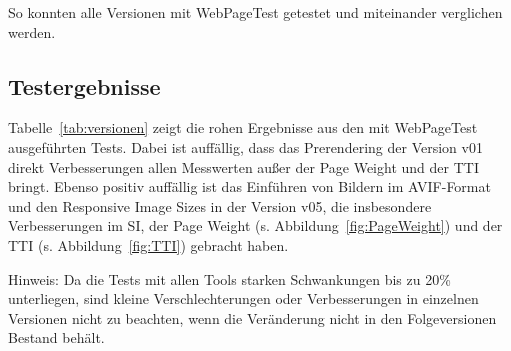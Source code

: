 \documentclass[11pt,a4paper]{article}
\begin{document}
So konnten alle Versionen mit WebPageTest getestet und miteinander verglichen werden.

\subsection{Testergebnisse}
Tabelle~\ref{tab:versionen} zeigt die rohen Ergebnisse aus den mit WebPageTest ausgeführten Tests.
Dabei ist auffällig, dass das Prerendering der Version v01 direkt Verbesserungen allen Messwerten außer der Page Weight und der TTI bringt.
Ebenso positiv auffällig ist das Einführen von Bildern im AVIF-Format und den Responsive Image Sizes in der Version v05, die insbesondere Verbesserungen im SI, der Page Weight (s. Abbildung~\ref{fig:PageWeight}) und der TTI (s. Abbildung~\ref{fig:TTI}) gebracht haben.

Hinweis: Da die Tests mit allen Tools starken Schwankungen bis zu 20\% unterliegen, sind kleine Verschlechterungen oder Verbesserungen in einzelnen Versionen nicht zu beachten, wenn die Veränderung nicht in den Folgeversionen Bestand behält.
\end{document}
